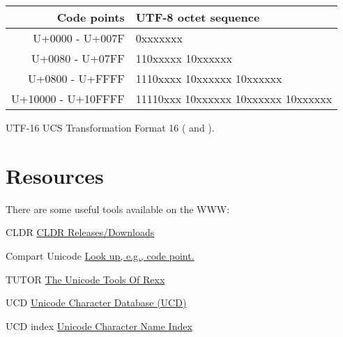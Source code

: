 \documentclass[b4paper]{article}
\begin{document}
\begin{definition}
\begin{tabular}{| r | l |}
\hline
Code points & UTF-8 octet sequence \\
\hline
U+0000 - U+007F    & 0xxxxxxx \\
\hline
U+0080 - U+07FF    & 110xxxxx 10xxxxxx \\
\hline
U+0800 - U+FFFF    & 1110xxxx 10xxxxxx 10xxxxxx \\
\hline
U+10000 - U+10FFFF & 11110xxx 10xxxxxx 10xxxxxx 10xxxxxx \\
\hline
\end{tabular}
\item [UTF-16] UCS Transformation Format 16
(\cite{Unicode3.9} and \cite{RFC 2781}).
\end{definition}


\section{Resources}
There are some useful tools available on the WWW:

\begin{resource}
\item[CLDR]%
\href{https://cldr.unicode.org/index/downloads}%
{CLDR Releases/Downloads}

\item[Compart Unicode]%
\href{https://www.compart.com/en/unicode/}%
{Look up, e.g., code point.}

\item[TUTOR]%
\href{https://github.com/RexxLA/rexx-repository/tree/master/ARB/standards/work-in-progress/unicode/UnicodeTools}%
{The Unicode Tools Of Rexx}

\item[UCD]%
\href{https://www.unicode.org/Public/UCD/latest/}%
{Unicode{\textregistered} Character Database (UCD)}

\item[UCD index]%
\href{https://www.unicode.org/charts/charindex.html}%
{Unicode{\textregistered} Character Name Index}
\end{resource}

\printindex
\end{document}
